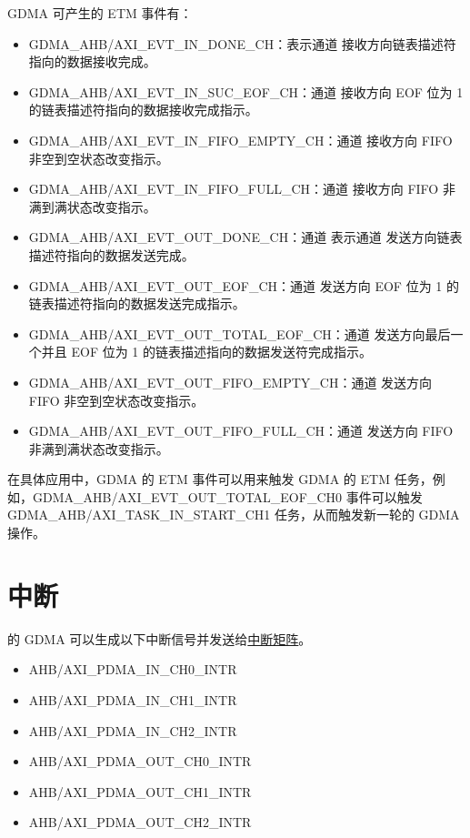 \documentclass[main\_\_CN.tex]{subfiles}
\begin{document}
GDMA 可产生的 ETM 事件有：

\begin{itemize}
\item GDMA\_AHB/AXI\_EVT\_IN\_DONE\_CH：表示通道  接收方向链表描述符指向的数据接收完成。
\item GDMA\_AHB/AXI\_EVT\_IN\_SUC\_EOF\_CH：通道  接收方向 EOF 位为 1 的链表描述符指向的数据接收完成指示。
\item GDMA\_AHB/AXI\_EVT\_IN\_FIFO\_EMPTY\_CH：通道  接收方向 FIFO 非空到空状态改变指示。
\item GDMA\_AHB/AXI\_EVT\_IN\_FIFO\_FULL\_CH：通道  接收方向 FIFO 非满到满状态改变指示。
\item GDMA\_AHB/AXI\_EVT\_OUT\_DONE\_CH：通道  表示通道  发送方向链表描述符指向的数据发送完成。
\item GDMA\_AHB/AXI\_EVT\_OUT\_EOF\_CH：通道  发送方向 EOF 位为 1 的链表描述符指向的数据发送完成指示。
\item GDMA\_AHB/AXI\_EVT\_OUT\_TOTAL\_EOF\_CH：通道  发送方向最后一个并且 EOF 位为 1 的链表描述指向的数据发送符完成指示。
\item GDMA\_AHB/AXI\_EVT\_OUT\_FIFO\_EMPTY\_CH：通道  发送方向 FIFO 非空到空状态改变指示。
\item GDMA\_AHB/AXI\_EVT\_OUT\_FIFO\_FULL\_CH：通道  发送方向 FIFO 非满到满状态改变指示。
\end{itemize}

在具体应用中，GDMA 的 ETM 事件可以用来触发 GDMA 的 ETM 任务，例如，GDMA\_AHB/AXI\_EVT\_OUT\_TOTAL\_EOF\_CH0 事件可以触发 GDMA\_AHB/AXI\_TASK\_IN\_START\_CH1 任务，从而触发新一轮的 GDMA 操作。


\section{中断}

\chipname{} 的 GDMA 可以生成以下中断信号并发送给\hyperref[mod:intmtrx]{中断矩阵}。

    \begin{itemize}
        \item AHB/AXI\_PDMA\_IN\_CH0\_INTR
        \item AHB/AXI\_PDMA\_IN\_CH1\_INTR
        \item AHB/AXI\_PDMA\_IN\_CH2\_INTR
        \item AHB/AXI\_PDMA\_OUT\_CH0\_INTR
        \item AHB/AXI\_PDMA\_OUT\_CH1\_INTR
        \item AHB/AXI\_PDMA\_OUT\_CH2\_INTR
    \end{itemize}
\end{document}
